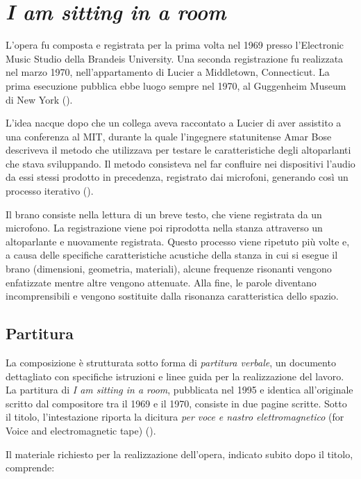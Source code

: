 
\section{\textit{I am sitting in a room}}
L'opera fu composta e registrata per la prima volta nel 1969 presso l'Electronic Music Studio della Brandeis University. Una seconda registrazione fu realizzata nel marzo 1970, nell'appartamento di Lucier a Middletown, Connecticut. La prima esecuzione pubblica ebbe luogo sempre nel 1970, al Guggenheim Museum di New York (\cite{Lucier1995}).

L'idea nacque dopo che un collega aveva raccontato a Lucier di aver assistito a una conferenza al MIT, durante la quale l'ingegnere statunitense Amar Bose descriveva il metodo che utilizzava per testare le caratteristiche degli altoparlanti che stava sviluppando. Il metodo consisteva nel far confluire nei dispositivi l'audio da essi stessi prodotto in precedenza, registrato dai microfoni, generando così un processo iterativo (\cite{Lucier2012}).

Il brano consiste nella lettura di un breve testo, che viene registrata da un microfono. La registrazione viene poi riprodotta nella stanza attraverso un altoparlante e nuovamente registrata. Questo processo viene ripetuto più volte e, a causa delle specifiche caratteristiche acustiche della stanza in cui si esegue il brano (dimensioni, geometria, materiali), alcune frequenze risonanti vengono enfatizzate mentre altre vengono attenuate. Alla fine, le parole diventano incomprensibili e vengono sostituite dalla risonanza caratteristica dello spazio.
\subsection{Partitura}
La composizione è strutturata sotto forma di \textit{partitura verbale}, un documento dettagliato con specifiche istruzioni e linee guida per la realizzazione del lavoro. La partitura di \textit{I am sitting in a room}, pubblicata nel 1995 e identica all'originale scritto dal compositore tra il 1969 e il 1970, consiste in due pagine scritte. Sotto il titolo, l'intestazione riporta la dicitura \textit{per voce e nastro elettromagnetico} (for Voice and electromagnetic tape) (\cite{Lucier1995}).

Il materiale richiesto per la realizzazione dell'opera, indicato subito dopo il titolo, comprende:

